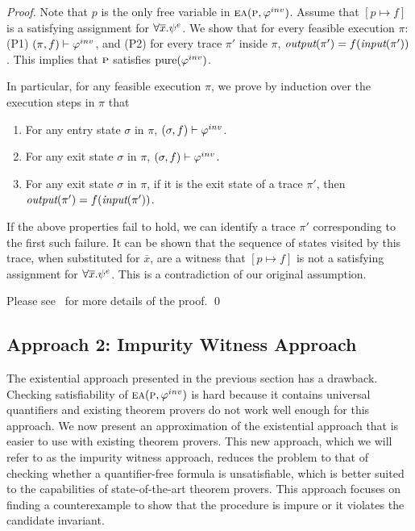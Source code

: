 \begin{proof}

Note that $p$ is the only free variable in $\textsc{ea}(\textsc{p},\varphi^{inv})$. Assume that $[p \mapsto f]$ is a
satisfying assignment
for  $ \forall \overline{x}. \psi^e$.
We show that for every feasible execution $\pi$: (P1) $(\pi, f)
\vdash \varphi^{inv}$, and (P2) for every trace $\pi'$ inside $\pi$,
$\textit{output}(\pi') = f(\textit{input}(\pi'))$. This implies that
$\textsc{p}$ satisfies $\mathrm{pure}(\varphi^{inv})$.

In particular, for any feasible execution $\pi$, we prove by induction over the
execution steps in $\pi$ that
\begin{enumerate}
\item For any entry state $\sigma$ in $\pi$, $(\sigma,f) \vdash \varphi^{inv}$.
\item For any exit state $\sigma$ in $\pi$, $(\sigma,f) \vdash \varphi^{inv}$.
\item For any exit state $\sigma$ in $\pi$, if it is the exit state of a trace $\pi'$,
then $\textit{output}(\pi') = f(\textit{input}(\pi'))$.
\end{enumerate}

If the above properties fail to hold, we can identify a trace $\pi'$ corresponding
to the first such failure. It can be shown that the sequence of
states visited by this trace, when substituted for $\overline{x}$, are a
witness that $[p \mapsto f]$ is not a satisfying assignment for  $\forall
\overline{x}. \psi^e$. This is a contradiction of our original
assumption. 


Please see~\cite{CheckingOP:arxiv} for more details of the proof.
\qed
\end{proof}

\subsection{Approach 2: Impurity Witness Approach}

The existential approach presented in the previous section has a drawback. Checking satisfiability of $\textsc{ea}(\textsc{p},\varphi^{inv})$
is hard because it contains universal quantifiers and existing theorem provers do not work well enough for this
approach. We now present an approximation of the existential approach that is easier to use with existing theorem
provers. This new approach, which we will refer to as the impurity witness approach, reduces the problem to
that of checking whether a quantifier-free formula is unsatisfiable, which is better suited to the capabilities of
state-of-the-art theorem provers. This approach focuses on finding a counterexample to show that the
procedure is impure or it violates the candidate invariant.

